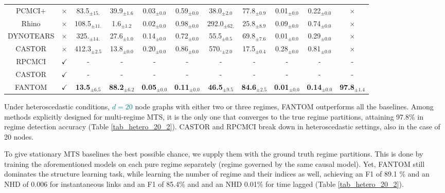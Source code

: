 \begin{table}[H]
{\begin{tabular}{@{}cc|cccccccc|c@{}}
PCMCI+ & $\times$ & 83.5$_{\pm15.}$ & 39.9$_{\pm1.6}$ & 0.03$_{\pm0.0}$ & 0.59$_{\pm0.0}$ & 38.0$_{\pm2.0}$ & 77.8$_{\pm0.9}$ & 0.01$_{\pm0.0}$ & 0.22$_{\pm0.0}$ & $\times$ \\
    Rhino & $\times$ &  108.5$_{\pm11.}$ & 1.6$_{\pm1.2}$ & 0.02$_{\pm0.0}$ & 0.98$_{\pm0.0}$ & 292.0$_{\pm62.}$ & 25.8$_{\pm8.9}$ & 0.09$_{\pm0.0}$ & 0.74$_{\pm0.0}$ & $\times$ \\
    DYNOTEARS & $\times$ &  325.$_{\pm14.}$ & 27.6$_{\pm1.0}$ & 0.14$_{\pm0.0}$ & 0.72$_{\pm0.0}$ & 55.5$_{\pm0.5}$ & 69.8$_{\pm7.6}$ & 0.01$_{\pm0.0}$ & 0.29$_{\pm0.0}$ & $\times$ \\
    CASTOR & $\times$ &  412.3$_{\pm2.5}$ & 13.8$_{\pm0.0}$ & 0.20$_{\pm0.0}$ & 0.86$_{\pm0.0}$ & 570.$_{\pm2.0}$ & 17.5$_{\pm0.4}$ & 0.28$_{\pm0.0}$ & 0.81$_{\pm0.0}$ & $\times$ \\
    \midrule
    RPCMCI & $\checkmark$ &  - & - & - & - & - & - & - & - & - \\
    CASTOR & $\checkmark$ &  - & - & - & - & - & - & - & - & - \\
    \rowcolor{gray!20} FANTOM & $\checkmark$  & \textbf{13.5}$_{\pm6.5}$& \textbf{88.2}$_{\pm6.2}$ & \textbf{0.05}$_{\pm0.0}$ & \textbf{0.11}$_{\pm0.0}$ & \textbf{46.5}$_{\pm9.5}$ & \textbf{84.6}$_{\pm2.5}$ & \textbf{0.01}$_{\pm0.0}$ & \textbf{0.14}$_{\pm0.0}$  & \textbf{97.8}$_{\pm1.4}$ \\\bottomrule
\end{tabular}}
\end{table}

Under heteroscedastic conditions, \textcolor{teal}{$d=20$} node graphs with either two or three regimes, FANTOM outperforms all the baselines. Among methods explicitly designed for multi-regime MTS, it is the only one that converges to the true regime partitions, attaining 97.8\% in regime detection accuracy (Table \ref{tab_hetero_20_2}). CASTOR and RPCMCI break down in heteroscedastic settings, also in the case of 20 nodes.

To give stationary MTS baselines the best possible chance, we supply them with the ground truth regime partitions. This is done by training the aforementioned models on each pure regime separately (regime governed by the same causal model). Yet, FANTOM still dominates the structure learning task, while learning the number of regime and their indices as well, achieving an F1 of 89.1 \% and an NHD of 0.006 for instantaneous links and an F1 of 85.4\% and and an NHD 0.01\% for time lagged (Table \ref{tab_hetero_20_2}). 


